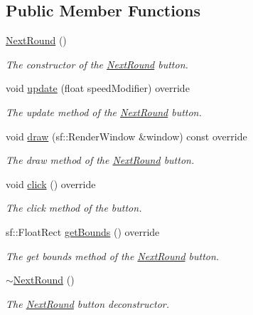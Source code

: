 \subsection*{Public Member Functions}
\begin{DoxyCompactItemize}
\item 
\hyperlink{class_next_round_a982702dd97812e9646939496c63a4871}{Next\+Round} ()
\begin{DoxyCompactList}\small\item\em The constructor of the \hyperlink{class_next_round}{Next\+Round} button. \end{DoxyCompactList}\item 
void \hyperlink{class_next_round_ab6c2cb6a601f19c9898f962973c765c2}{update} (float speed\+Modifier) override
\begin{DoxyCompactList}\small\item\em The update method of the \hyperlink{class_next_round}{Next\+Round} button. \end{DoxyCompactList}\item 
void \hyperlink{class_next_round_a53759483573d0d90ff07900643b01889}{draw} (sf\+::\+Render\+Window \&window) const override
\begin{DoxyCompactList}\small\item\em The draw method of the \hyperlink{class_next_round}{Next\+Round} button. \end{DoxyCompactList}\item 
void \hyperlink{class_next_round_a4a8032a6c21bdf374edd7cd4551ce970}{click} () override
\begin{DoxyCompactList}\small\item\em The click method of the button. \end{DoxyCompactList}\item 
sf\+::\+Float\+Rect \hyperlink{class_next_round_adddbc077e18c8b2911e85843aaa4d611}{get\+Bounds} () override
\begin{DoxyCompactList}\small\item\em The get bounds method of the \hyperlink{class_next_round}{Next\+Round} button. \end{DoxyCompactList}\item 
\hyperlink{class_next_round_a5ecf1749c08a7192b0f283cfcda31cb5}{$\sim$\+Next\+Round} ()
\begin{DoxyCompactList}\small\item\em The \hyperlink{class_next_round}{Next\+Round} button deconstructor. \end{DoxyCompactList}\end{DoxyCompactItemize}

